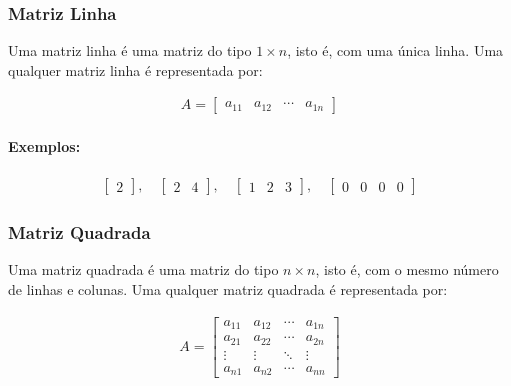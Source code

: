 \subsubsection{Matriz Linha}
\indent

Uma matriz linha é uma matriz do tipo \( 1 \times n \), isto é, com uma única linha. Uma qualquer matriz linha é representada por:

\[
    \begin{matrix}
        A = \begin{bmatrix}
                a_{11} & a_{12} & \cdots & a_{1n}
            \end{bmatrix}
    \end{matrix}
\]

\paragraph{Exemplos:}

\[
    \begin{matrix}
        \begin{bmatrix}
            2
        \end{bmatrix},
        \quad
        \begin{bmatrix}
            2 & 4
        \end{bmatrix},
        \quad
        \begin{bmatrix}
            1 & 2 & 3
        \end{bmatrix},
        \quad
        \begin{bmatrix}
            0 & 0 & 0 & 0
        \end{bmatrix}
    \end{matrix}
\]

\subsubsection{Matriz Quadrada}
\indent

Uma matriz quadrada é uma matriz do tipo \( n \times n \), isto é, com o mesmo número de linhas e colunas. Uma qualquer matriz quadrada é representada por:

\[
    \begin{matrix}
        A = \begin{bmatrix}
                a_{11} & a_{12} & \cdots & a_{1n} \\
                a_{21} & a_{22} & \cdots & a_{2n} \\
                \vdots & \vdots & \ddots & \vdots \\
                a_{n1} & a_{n2} & \cdots & a_{nn}
            \end{bmatrix}
    \end{matrix}
\]

